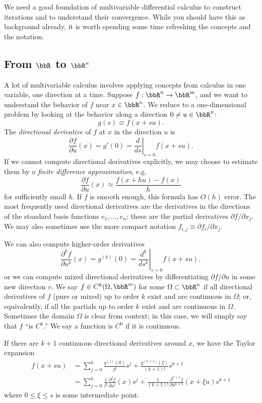 \documentclass[12pt, leqno]{article} %
\begin{document}
We need a good foundation of multivariable differential calculus
to construct iterations and to understand their convergence.
While you should have this as background already, it is worth
spending some time refreshing the concepts and the notation.

\subsection*{From $\bbR$ to $\bbR^n$}


A lot of multivariable calculus involves applying concepts from
calculus in one variable, one direction at a time.
Suppose $f : \bbR^n \rightarrow \bbR^m$, and we want to
understand the behavior of $f$ near $x \in \bbR^n$.
We reduce to a one-dimensional problem by looking
at the behavior along a direction $0 \neq u \in \bbR^n$:
\[
  g(s) \equiv f(x+su).
\]
The {\em directional derivative} of $f$ at $x$ in the direction
$u$ is 
\[
  \frac{\partial f}{\partial u}(x) =
  g'(0) = 
  \left. \frac{d}{ds} \right|_{s=0} f(x+su).
\]
If we cannot compute directional derivatives explicitly, we may choose
to estimate them by a {\em finite difference approximation}, e.g.
\[
  \frac{\partial f}{\partial u}(x) \approx \frac{f(x+hu)-f(x)}{h}
\]
for sufficiently small $h$.  If $f$ is smooth enough, this formula has
$O(h)$ error.  The most frequently used directional derivatives are
the derivatives in the directions of the standard basis functions
$e_1, \ldots, e_n$; these are the partial derivatives $\partial f /
\partial x_j$.  We may also sometimes use the more compact notation
$f_{i,j} \equiv \partial f_i / \partial x_j$.

We can also compute higher-order derivatives
\[
  \frac{\partial^k f}{\partial u^k}(x) =
  g^{(k)}(0) =
  \left. \frac{d^k}{ds^k} \right|_{s=0} f(x+su),
\]
or we can compute mixed directional derivatives by differentiating
$\partial f/\partial u$ in some new direction $v$.  We say
$f \in C^k(\Omega, \bbR^m)$ for some $\Omega \subset \bbR^n$ if all
directional derivatives of $f$ (pure or mixed) up to order $k$ exist
and are continuous in $\Omega$; or, equivalently, if all the partials
up to order $k$ exist and are continuous in $\Omega$.  Sometimes the
domain $\Omega$ is clear from context; in this case, we will simply
say that $f$ ``is $C^k$.''  We say a function is $C^0$ if it is
continuous.

If there are $k+1$ continuous directional derivatives around $x$,
we have the Taylor expansion
\begin{align*}
  f(x+su)
  &= \sum_{j=0}^k \frac{g^{(j)}(0)}{j!} s^j +
  \frac{g^{(k+1)}(\xi)}{(k+1)!} s^{k+1} \\
  &= \sum_{j=0}^k \frac{1}{j!} \frac{\partial^j f}{\partial u^j}(x) s^j +
  \frac{1}{(k+1)!} \frac{\partial^{k+1} f}{\partial u^{k+1}}(x+\xi u) s^{k+1}
\end{align*}
where $0 \leq \xi \leq s$ is some intermediate point.
\end{document}
